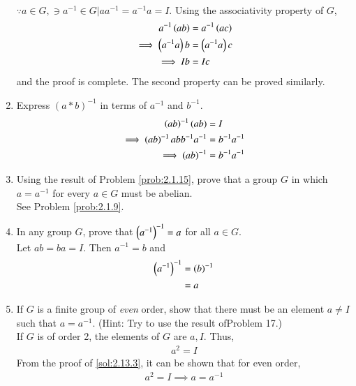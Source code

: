 \begin{enumerate}[label=\arabic*.,ref=\thesubsection.\theenumi]
	\\
	\solution $\because a \in G, \ni a^{-1} \in G | aa^{-1} = a^{-1}a = I$.  Using the associativity property of $G$,  
			\begin{align}
				a^{-1}\left(ab\right)
				&=
				a^{-1}\left(ac\right)
				\\
				\implies 
				\left(a^{-1}a\right)b
				&=
				\left(a^{-1}a\right)c
				\\
				\implies Ib &= Ic
			\end{align}
			and the proof is complete.  The second property can be proved similarly.
		\item Express $(a * b)^{-1}$ in terms of $a^{-1}$ and $b^{- 1}$.
			\label{prob:2.1.15}
			\\
			\solution 
			\begin{align}
				\left(ab\right)^{-1} (ab) &= I
				\\
				\implies \left(ab\right)^{-1} abb^{-1}a^{-1} &= b^{-1}a^{-1}
				\\
				\implies \left(ab\right)^{-1}  &= b^{-1}a^{-1}
			\end{align}
		\item Using the result of Problem 
			\ref{prob:2.1.15},
 prove that a group $G$ in which $a = a^{-1}$ for every $a \in  G$ must be abelian.
 \\
 \solution See Problem 
	\ref{prob:2.1.9}.
\item In any group $G$, prove that $\left(a^{-1}\right)^{-1} = a$ for all $a \in  G$.
	\\
	\solution Let $ab = ba = I$.  Then $a^{-1} = b $ and 
			\begin{align}
				\left(a^{-1}\right)^{-1} &= 
\left(b\right)^{-1} 
\\
				&= a
			\end{align}
		\item 
			If $G$ is a finite group of {\em even} order, show that there must be an element $a \ne I$ such that $a = a^{-1}$. (Hint: Try to use the result ofProblem 17.)
			\\
			\solution If $G$ is of order 2, the elements of $G$ are $a, I$.  Thus,
			\begin{align}
				a^2 = I
			\end{align}
			From the proof of 
	\ref{sol:2.13.3}, it can be shown that for even order, 
			\begin{align}
				a^2 = I \implies   a = a^{-1}
			\end{align}
\end{enumerate}                          
